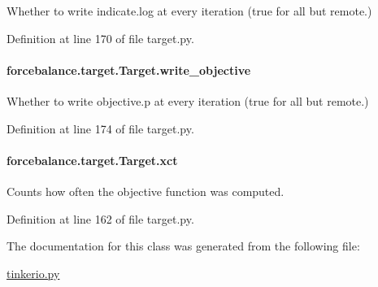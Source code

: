 Whether to write indicate.\-log at every iteration (true for all but remote.) 



Definition at line 170 of file target.\-py.

\hypertarget{classforcebalance_1_1target_1_1Target_a7a95624dfe03f0cee0e5f1ae09db306a}{
\paragraph[{write\-\_\-objective}]{\setlength{\rightskip}{0pt plus 5cm}forcebalance.\-target.\-Target.\-write\-\_\-objective\hspace{0.3cm}{\ttfamily [inherited]}}}\label{classforcebalance_1_1target_1_1Target_a7a95624dfe03f0cee0e5f1ae09db306a}


Whether to write objective.\-p at every iteration (true for all but remote.) 



Definition at line 174 of file target.\-py.

\hypertarget{classforcebalance_1_1target_1_1Target_aad2e385cfbf7b4a68f1c2cb41133fe82}{
\paragraph[{xct}]{\setlength{\rightskip}{0pt plus 5cm}forcebalance.\-target.\-Target.\-xct\hspace{0.3cm}{\ttfamily [inherited]}}}\label{classforcebalance_1_1target_1_1Target_aad2e385cfbf7b4a68f1c2cb41133fe82}


Counts how often the objective function was computed. 



Definition at line 162 of file target.\-py.



The documentation for this class was generated from the following file\-:\begin{DoxyCompactItemize}
\item 
\hyperlink{tinkerio_8py}{tinkerio.\-py}\end{DoxyCompactItemize}
